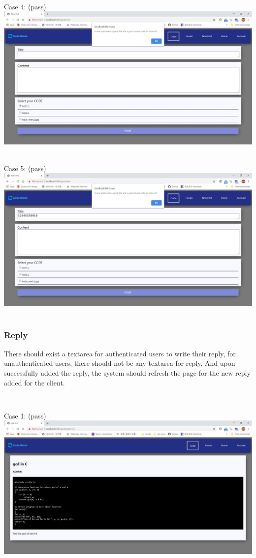 ~

Case 4: (pass)\\
\includegraphics[scale=0.45]{Doc/Pics/case-8-1-4}\\

~

Case 5: (pass)\\
\includegraphics[scale=0.45]{Doc/Pics/case-8-1-5}\\

~

\subsubsection{Reply}
There should exist a textarea for authenticated users to write their reply, for unauthenticated users, there should not be any textarea for reply. And upon successfully added the reply, the system should refresh the page for the new reply added for the client.

~

Case 1: (pass)\\
\includegraphics[scale=0.45]{Doc/Pics/case-8-2-1}\\

